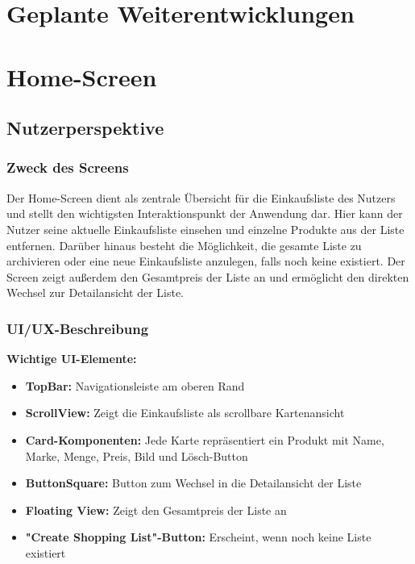 \documentclass[12pt, a4paper]{report} %
\begin{document}
\section{Geplante Weiterentwicklungen}

\section{Home-Screen}
\label{sec:home_screen}

\subsection{Nutzerperspektive}

\subsubsection{Zweck des Screens}
Der Home-Screen dient als zentrale Übersicht für die Einkaufsliste des Nutzers und stellt den wichtigsten Interaktionspunkt der Anwendung dar. Hier kann der Nutzer seine aktuelle Einkaufsliste einsehen und einzelne Produkte aus der Liste entfernen. Darüber hinaus besteht die Möglichkeit, die gesamte Liste zu archivieren oder eine neue Einkaufsliste anzulegen, falls noch keine existiert. Der Screen zeigt außerdem den Gesamtpreis der Liste an und ermöglicht den direkten Wechsel zur Detailansicht der Liste.

\subsubsection{UI/UX-Beschreibung}

\textbf{Wichtige UI-Elemente:}
\begin{itemize}
    \item \textbf{TopBar:} Navigationsleiste am oberen Rand
    \item \textbf{ScrollView:} Zeigt die Einkaufsliste als scrollbare Kartenansicht
    \item \textbf{Card-Komponenten:} Jede Karte repräsentiert ein Produkt mit Name, Marke, Menge, Preis, Bild und Lösch-Button
    \item \textbf{ButtonSquare:} Button zum Wechsel in die Detailansicht der Liste
    \item \textbf{Floating View:} Zeigt den Gesamtpreis der Liste an
    \item \textbf{"Create Shopping List"-Button:} Erscheint, wenn noch keine Liste existiert
\end{itemize}
\end{document}
